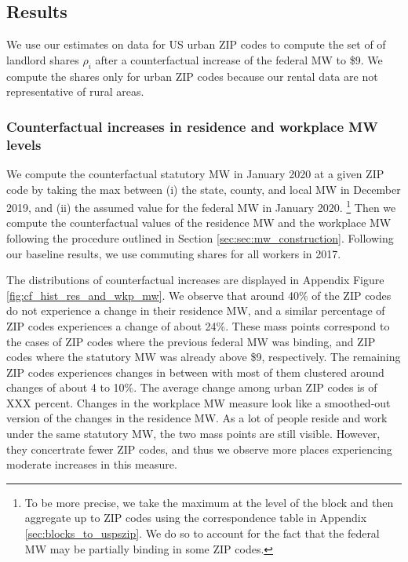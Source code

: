 \subsection{Results}\label{sec:results_cf}

We use our estimates on data for US urban ZIP codes to compute the set of
of landlord shares ${\rho_i}$ after a counterfactual increase of the federal 
MW to \$9.
We compute the shares only for urban ZIP codes because our rental data are not 
representative of rural areas.

\subsubsection*{Counterfactual increases in residence and workplace MW levels}
\label{sec:cf_res_and_wkp_changes}

We compute the counterfactual statutory MW in January 2020 at a given ZIP code 
by taking the max between (i) the state, county, and local MW in December 2019, 
and (ii) the assumed value for the federal MW in January 2020.%
\footnote{To be more precise, we take the maximum at the level of the block and 
then aggregate up to ZIP codes using the correspondence table in Appendix 
\ref{sec:blocks_to_uspszip}.
We do so to account for the fact that the federal MW may be partially binding
in some ZIP codes.}
Then we compute the counterfactual values of the residence MW and the workplace
MW following the procedure outlined in Section \ref{sec:sec:mw_construction}.
Following our baseline results, we use commuting shares for all workers in
2017.

The distributions of counterfactual increases are displayed in Appendix
Figure \ref{fig:cf_hist_res_and_wkp_mw}.
We observe that around 40\% of the ZIP codes do not experience a change 
in their residence MW, and a similar percentage of ZIP codes experiences a
change of about 24\%.
These mass points correspond to the cases of ZIP codes where the previous 
federal MW was binding, and ZIP codes where the statutory MW was already 
above \$9, respectively.
The remaining ZIP codes experiences changes in between with most of them
clustered around changes of about 4 to 10\%.
The average change among urban ZIP codes is of XXX percent.
Changes in the workplace MW measure look like a smoothed-out version of
the changes in the residence MW.
As a lot of people reside and work under the same statutory MW, the two mass
points are still visible.
However, they concertrate fewer ZIP codes, and thus we observe more places 
experiencing moderate increases in this measure.



